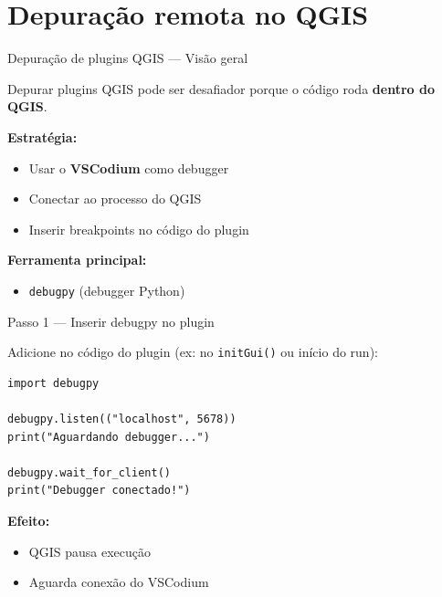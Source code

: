 \documentclass{beamer}
\begin{document}
\section{Depuração remota no QGIS}

\begin{frame}{Depuração de plugins QGIS — Visão geral}
    
    Depurar plugins QGIS pode ser desafiador porque o código roda \textbf{dentro do QGIS}.
    
    \vspace{0.4cm}
    
    \textbf{Estratégia:}
    
    \begin{itemize}
        \item Usar o \textbf{VSCodium} como debugger
        \item Conectar ao processo do QGIS
        \item Inserir breakpoints no código do plugin
    \end{itemize}
    
    \vspace{0.4cm}
    
    \textbf{Ferramenta principal:}
    
    \begin{itemize}
        \item \texttt{debugpy} (debugger Python)
    \end{itemize}
    
\end{frame}

\begin{frame}[fragile]{Passo 1 — Inserir debugpy no plugin}
    
    Adicione no código do plugin (ex: no \texttt{initGui()} ou início do run):
    
    \begin{verbatim}
import debugpy

debugpy.listen(("localhost", 5678))
print("Aguardando debugger...")

debugpy.wait_for_client()
print("Debugger conectado!")
    \end{verbatim}
    
    \vspace{0.3cm}
    
    \textbf{Efeito:}
    
    \begin{itemize}
        \item QGIS pausa execução
        \item Aguarda conexão do VSCodium
    \end{itemize}
    
\end{frame}
\end{document}

